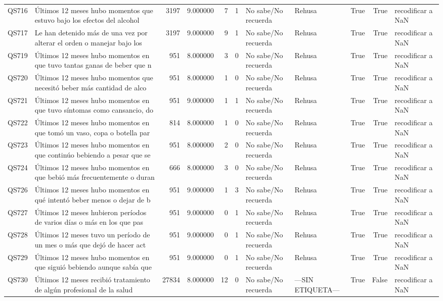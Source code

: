 \begin{longtable}{llrrrrllrrl}
QS716 & Últimos 12 meses hubo momentos que estuvo bajo los efectos del alcohol & 3197 & 9.000000 & 7 & 1 & No sabe/No recuerda & Rehusa & True & True & recodificar a NaN \\
QS717 & Le han detenido más de una vez por alterar el orden o manejar bajo los & 3197 & 9.000000 & 9 & 1 & No sabe/No recuerda & Rehusa & True & True & recodificar a NaN \\
QS719 & Últimos 12 meses hubo momentos en que tuvo tantas ganas de beber que n & 951 & 8.000000 & 3 & 0 & No sabe/No recuerda & Rehusa & True & True & recodificar a NaN \\
QS720 & Últimos 12 meses hubo momentos que necesitó beber más cantidad de alco & 951 & 8.000000 & 1 & 0 & No sabe/No recuerda & Rehusa & True & True & recodificar a NaN \\
QS721 & Últimos 12 meses hubo momentos en que tuvo síntomas como cansancio, do & 951 & 9.000000 & 1 & 1 & No sabe/No recuerda & Rehusa & True & True & recodificar a NaN \\
QS722 & Últimos 12 meses hubo momentos en que tomó un vaso, copa o botella par & 814 & 8.000000 & 1 & 0 & No sabe/No recuerda & Rehusa & True & True & recodificar a NaN \\
QS723 & Últimos 12 meses hubo momentos en que continúo bebiendo a pesar que se & 951 & 8.000000 & 2 & 0 & No sabe/No recuerda & Rehusa & True & True & recodificar a NaN \\
QS724 & Últimos 12 meses hubo momentos en que bebió más frecuentemente o duran & 666 & 8.000000 & 3 & 0 & No sabe/No recuerda & Rehusa & True & True & recodificar a NaN \\
QS726 & Últimos 12 meses hubo momentos en qué intentó beber menos o dejar de b & 951 & 9.000000 & 1 & 3 & No sabe/No recuerda & Rehusa & True & True & recodificar a NaN \\
QS727 & Últimos 12 meses hubieron períodos de varios días o más en los que pas & 951 & 9.000000 & 0 & 1 & No sabe/No recuerda & Rehusa & True & True & recodificar a NaN \\
QS728 & Últimos 12 meses tuvo un período de un mes o más que dejó de hacer act & 951 & 9.000000 & 0 & 1 & No sabe/No recuerda & Rehusa & True & True & recodificar a NaN \\
QS729 & Últimos 12 meses hubo momentos en que siguió bebiendo aunque sabía que & 951 & 9.000000 & 0 & 1 & No sabe/No recuerda & Rehusa & True & True & recodificar a NaN \\
QS730 & Últimos 12 meses recibió tratamiento de algún profesional de la salud  & 27834 & 8.000000 & 12 & 0 & No sabe/No recuerda & —SIN ETIQUETA— & True & False & recodificar a NaN \\

\end{longtable}
